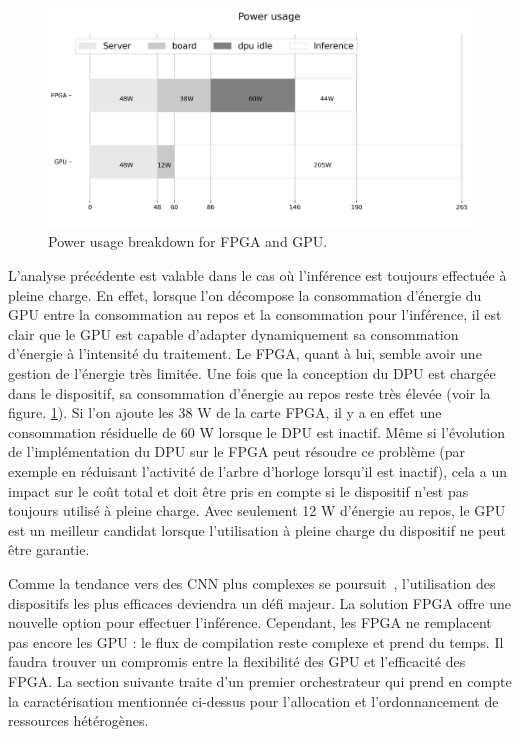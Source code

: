 \begin{figure}[t]
\centering
\includegraphics[width=\columnwidth]{4_Chapitre4/figures/characterization/power_usage.png}
\caption{Power usage breakdown for FPGA and GPU.}
\label{figure:herofake-power-usage}
\end{figure}

L'analyse précédente est valable dans le cas où l'inférence est toujours effectuée à pleine charge. En effet, lorsque l'on décompose la consommation d'énergie du GPU entre la consommation au repos et la consommation pour l'inférence, il est clair que le GPU est capable d'adapter dynamiquement sa consommation d'énergie à l'intensité du traitement. Le FPGA, quant à lui, semble avoir une gestion de l'énergie très limitée. Une fois que la conception du DPU est chargée dans le dispositif, sa consommation d'énergie au repos reste très élevée (voir la figure. \ref{figure:herofake-power-usage}). Si l'on ajoute les 38 W de la carte FPGA, il y a en effet une consommation résiduelle de 60 W lorsque le DPU est inactif. Même si l'évolution de l'implémentation du DPU sur le FPGA peut résoudre ce problème (par exemple en réduisant l'activité de l'arbre d'horloge lorsqu'il est inactif), cela a un impact sur le coût total et doit être pris en compte si le dispositif n'est pas toujours utilisé à pleine charge. Avec seulement 12 W d'énergie au repos, le GPU est un meilleur candidat lorsque l'utilisation à pleine charge du dispositif ne peut être garantie.

Comme la tendance vers des CNN plus complexes se poursuit~\cite{8807741}, l'utilisation des dispositifs les plus efficaces deviendra un défi majeur. La solution FPGA offre une nouvelle option pour effectuer l'inférence. Cependant, les FPGA ne remplacent pas encore les GPU : le flux de compilation reste complexe et prend du temps. Il faudra trouver un compromis entre la flexibilité des GPU et l'efficacité des FPGA. La section suivante traite d'un premier orchestrateur qui prend en compte la caractérisation mentionnée ci-dessus pour l'allocation et l'ordonnancement de ressources hétérogènes.

